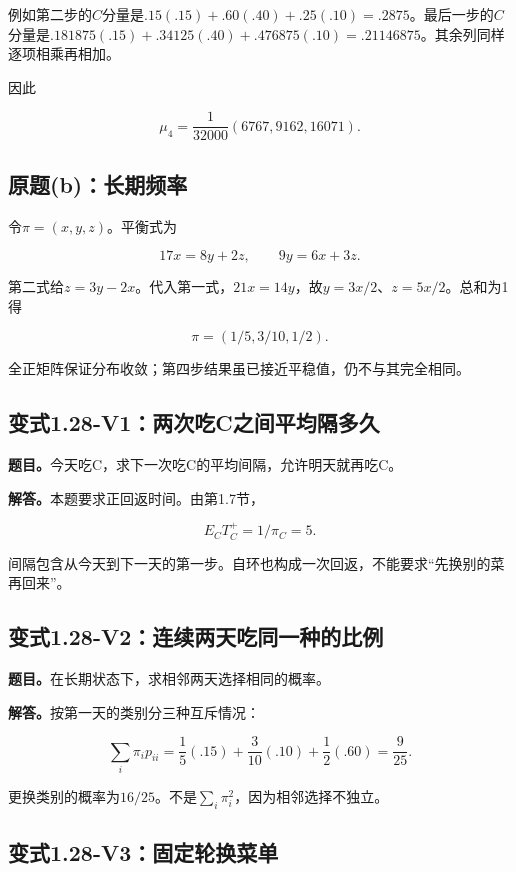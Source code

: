 \documentclass[
  11pt,
  a4paper,
  UTF8,
  fontset=fandol]{ctexart}
\begin{document}
例如第二步的\(C\)分量是\(.15(.15)+.60(.40)+.25(.10)=.2875\)。最后一步的\(C\)分量是\(.181875(.15)+.34125(.40)+.476875(.10)=.21146875\)。其余列同样逐项相乘再相加。

因此

\[
\boxed{\mu_4=\frac1{32000}(6767,9162,16071).}
\]

\subsection{原题(b)：长期频率}\label{ux539fux9898bux957fux671fux9891ux7387}

令\(\pi=(x,y,z)\)。平衡式为

\[
17x=8y+2z,\qquad 9y=6x+3z.
\]

第二式给\(z=3y-2x\)。代入第一式，\(21x=14y\)，故\(y=3x/2\)、\(z=5x/2\)。总和为1得

\[
\boxed{\pi=(1/5,3/10,1/2).}
\]

全正矩阵保证分布收敛；第四步结果虽已接近平稳值，仍不与其完全相同。

\subsection{变式1.28-V1：两次吃C之间平均隔多久}\label{ux53d8ux5f0f1.28-v1ux4e24ux6b21ux5403cux4e4bux95f4ux5e73ux5747ux9694ux591aux4e45}

\textbf{题目。}今天吃C，求下一次吃C的平均间隔，允许明天就再吃C。

\textbf{解答。}本题要求正回返时间。由第1.7节，

\[
\boxed{E_CT_C^+=1/\pi_C=5.}
\]

间隔包含从今天到下一天的第一步。自环也构成一次回返，不能要求``先换别的菜再回来''。

\subsection{变式1.28-V2：连续两天吃同一种的比例}\label{ux53d8ux5f0f1.28-v2ux8fdeux7eedux4e24ux5929ux5403ux540cux4e00ux79cdux7684ux6bd4ux4f8b}

\textbf{题目。}在长期状态下，求相邻两天选择相同的概率。

\textbf{解答。}按第一天的类别分三种互斥情况：

\[
\sum_i\pi_ip_{ii}=\frac15(.15)+\frac3{10}(.10)+\frac12(.60)
=\boxed{\frac9{25}}.
\]

更换类别的概率为\(16/25\)。不是\(\sum_i\pi_i^2\)，因为相邻选择不独立。

\subsection{变式1.28-V3：固定轮换菜单}\label{ux53d8ux5f0f1.28-v3ux56faux5b9aux8f6eux6362ux83dcux5355}
\end{document}
